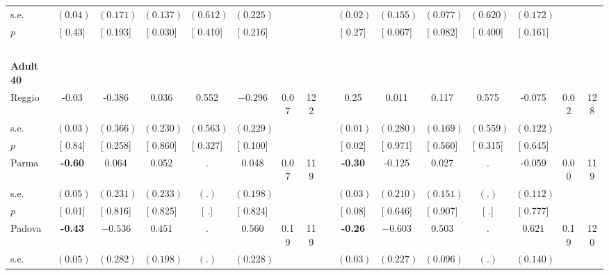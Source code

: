 \begin{longtable}{L{8em} c c c c c c c p{1em} c c c c c c c}
\quad \quad \quad \quad s.e.& $ (     0.04)$ & $ (    0.171)$ & $ (    0.137)$ & $ (    0.612)$ & $ (    0.225)$ & & & & $ (     0.02)$ & $ (    0.155)$ & $ (    0.077)$ & $ (    0.620)$ & $ (    0.172)$ & &  \\*
\quad \quad \quad \quad $ p$ & [     0.43] & [    0.193] & [    0.030] & [    0.410] & [    0.216] & & & & [     0.27] & [    0.067] & [    0.082] & [    0.400] & [    0.161] & &  \\[1em]
~\\[1em]
\quad \quad \textbf{Adult 40} & & & & & & & & & & & & & & & \\* 
\quad \quad \quad Reggio& -0.03 &    -0.386 &     0.036 &     0.552 & $ \mathbf{   -0.296}$ &      0.07 &       122 & & 0.25 &     0.011 &     0.117 &     0.575 &    -0.075 &      0.02 &       128  \\*
\quad \quad \quad \quad s.e.& $ (     0.03)$ & $ (    0.366)$ & $ (    0.230)$ & $ (    0.563)$ & $ (    0.229)$ & & & & $ (     0.01)$ & $ (    0.280)$ & $ (    0.169)$ & $ (    0.559)$ & $ (    0.122)$ & &  \\*
\quad \quad \quad \quad $ p$ & [     0.84] & [    0.258] & [    0.860] & [    0.327] & [    0.100] & & & & [     0.02] & [    0.971] & [    0.560] & [    0.315] & [    0.645] & &  \\[1em]
\quad \quad \quad Parma& \textbf{    -0.60} &     0.064 &     0.052 &         . &     0.048 &      0.07 &       119 & & \textbf{    -0.30} &    -0.125 &     0.027 &         . &    -0.059 &      0.00 &       119  \\*
\quad \quad \quad \quad s.e.& $ (     0.05)$ & $ (    0.231)$ & $ (    0.233)$ & $ (        .)$ & $ (    0.198)$ & & & & $ (     0.03)$ & $ (    0.210)$ & $ (    0.151)$ & $ (        .)$ & $ (    0.112)$ & &  \\*
\quad \quad \quad \quad $ p$ & [     0.01] & [    0.816] & [    0.825] & [        .] & [    0.824] & & & & [     0.08] & [    0.646] & [    0.907] & [        .] & [    0.777] & &  \\[1em]
\quad \quad \quad Padova& \textbf{    -0.43} & $ \mathbf{   -0.536}$ & $ \mathbf{    0.451}$ &         . & $ \mathbf{    0.560}$ &      0.19 &       119 & & \textbf{    -0.26} & $ \mathbf{   -0.603}$ & $ \mathbf{    0.503}$ &         . & $ \mathbf{    0.621}$ &      0.19 &       120  \\*
\quad \quad \quad \quad s.e.& $ (     0.05)$ & $ (    0.282)$ & $ (    0.198)$ & $ (        .)$ & $ (    0.228)$ & & & & $ (     0.03)$ & $ (    0.227)$ & $ (    0.096)$ & $ (        .)$ & $ (    0.140)$ & &  \\*

\end{longtable}
